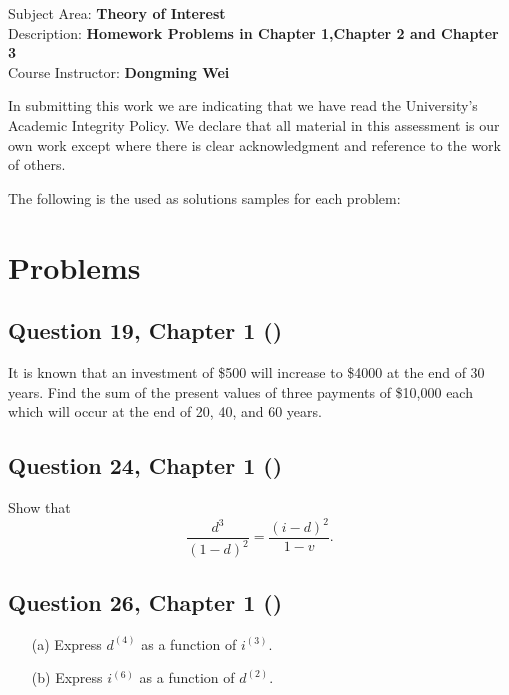 \documentclass[12pt, a4paper]{article}
\begin{document}
\begin{titlepage}
  \begin{flushleft}
      Subject Area: \textbf{Theory of Interest} \\
      Description: \textbf{Homework Problems in Chapter 1,Chapter 2 and Chapter 3} \\
      Course Instructor: \textbf{Dongming Wei} \\
    \end{flushleft}
    
    \vspace{0.5cm}
    
    {\footnotesize In submitting this work we are indicating
    that we have read the University's Academic Integrity Policy. We
    declare that all material in this assessment is our own work except
    where there is clear acknowledgment and reference to the work of
    others.\par}
\end{titlepage}
The following is the used as solutions samples for each problem:
\newpage
\section*{Problems}
\subsection*{Question 19, Chapter 1  (\cite{toi3rd})}
\noindent It is known that an investment of \$500 will increase to \$4000 at the end of 30 years. Find the sum of the present values of three payments of \$10,000 each which will occur at the end of 20, 40, and 60 years.

\subsection*{Question 24, Chapter 1  (\cite{toi3rd})}
\noindent Show that
\[
\frac{d^3}{(1 - d)^2} = \frac{(i - d)^2}{1 - v}.
\]

\subsection*{Question 26, Chapter 1  (\cite{toi3rd})}
\noindent
\begin{enumerate}
    \item[(a)] Express \( d^{(4)} \) as a function of \( i^{(3)} \).
    \item[(b)] Express \( i^{(6)} \) as a function of \( d^{(2)} \).
\end{enumerate}
\end{document}
